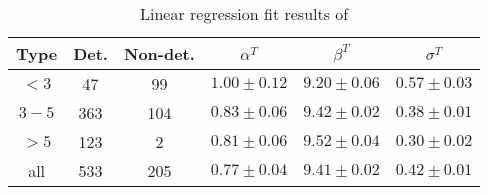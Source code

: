 \begin{table}
\centering
\caption{Linear regression fit results of }\label{tab:mcmc_fit}
\addtolength{\tabcolsep}{-2pt}
\begin{tabular}{c c c c c c} 
\hline 
\hline 
\rule{0pt}{10pt}
Type & Det. & Non-det. & $\alpha^T$ & $\beta^T$ & $\sigma^T$ \\ 
\hline \rule{0pt}{10pt}
${<}3$ & 47 & 99 & $1.00\pm0.12$ & $9.20\pm0.06$ & $0.57\pm0.03$ \\ 
$3{-}5$ & 363 & 104 & $0.83\pm0.06$ & $9.42\pm0.02$ & $0.38\pm0.01$ \\ 
${>}5$ & 123 & 2 & $0.81\pm0.06$ & $9.52\pm0.04$ & $0.30\pm0.02$ \\ 
all & 533 & 205 & $0.77\pm0.04$ & $9.41\pm0.02$ & $0.42\pm0.01$ \\ 
\hline
\end{tabular}
\end{table}